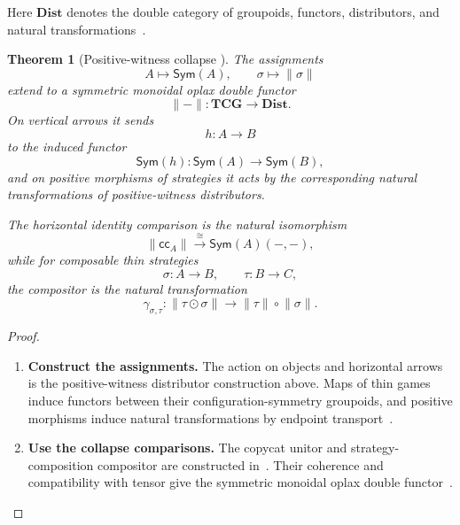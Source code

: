 \documentclass[oneside]{article}
\newcommand{\Sym}{\mathsf{Sym}}
\newcommand{\cc}{\mathsf{cc}}
\theoremstyle{plain}
\newtheorem{theorem}{Theorem}[section]
\theoremstyle{definition}
\theoremstyle{remark}
\begin{document}
Here \(\mathbf{Dist}\) denotes the double category of groupoids, functors, distributors, and natural transformations~\cite[Example~3.3]{ClairambaultOlimpieriPaquet2025}.

\begin{theorem}[Positive-witness collapse
{\cite[Thm.~5.15]{ClairambaultOlimpieriPaquet2025}}]
\label{thm:cgqg-background-positive-witness-double-functor}
    The assignments
    \[
        A\longmapsto\Sym(A),
        \qquad
        \sigma\longmapsto\lVert\sigma\rVert
    \]
    extend to a symmetric monoidal oplax double functor
    \[
        \lVert-\rVert:
        \mathbf{TCG}\longrightarrow\mathbf{Dist}.
    \]
    On vertical arrows it sends
    \[
        h:A\longrightarrow B
    \]
    to the induced functor
    \[
        \Sym(h):\Sym(A)\longrightarrow\Sym(B),
    \]
    and on positive morphisms of strategies it acts by the corresponding natural transformations of positive-witness distributors.

    The horizontal identity comparison is the natural isomorphism
    \[
        \lVert\cc_A\rVert
        \xrightarrow{\cong}
        \Sym(A)(-,-),
    \]
    while for composable thin strategies
    \[
        \sigma:A\longrightarrow B,
        \qquad
        \tau:B\longrightarrow C,
    \]
    the compositor is the natural transformation
    \begin{equation}
        \gamma_{\sigma,\tau}:
        \lVert\tau\odot\sigma\rVert
        \longrightarrow
        \lVert\tau\rVert\circ\lVert\sigma\rVert.
    \label{eq:cgqg-background-positive-witness-compositor}
    \end{equation}
\end{theorem}
\begin{proof}
    \leavevmode
    \begin{enumerate}[beginpenalty=10000]
        \item \textbf{Construct the assignments.} The action on objects and horizontal arrows is the positive-witness distributor construction above. Maps of thin games induce functors between their configuration-symmetry groupoids, and positive morphisms induce natural transformations by endpoint transport~\cite[\S\S5.4.1--5.4.2]{ClairambaultOlimpieriPaquet2025}.

        \item \textbf{Use the collapse comparisons.} The copycat unitor and strategy-composition compositor are constructed in~\cite[Props.~5.12--5.13]{ClairambaultOlimpieriPaquet2025}. Their coherence and compatibility with tensor give the symmetric monoidal oplax double functor~\cite[Thm.~5.15]{ClairambaultOlimpieriPaquet2025}. \qedhere
    \end{enumerate}
\end{proof}
\end{document}
